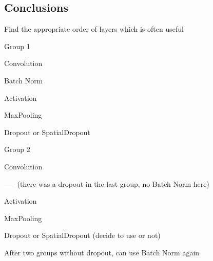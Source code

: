 	\subsection{Conclusions}
Find the appropriate order of layers which is often useful
	\begin{bulletedlist}
	\item Group 1
		\begin{bulletedlist}
			\item Convolution
			\item Batch Norm
			\item Activation
			\item MaxPooling
			\item Dropout or SpatialDropout
		\end{bulletedlist}
	\item Group 2
		\begin{bulletedlist}
			\item Convolution
			\item ----- (there was a dropout in the last group, no Batch Norm here)
			\item Activation
			\item MaxPooling
			\item Dropout or SpatialDropout (decide to use or not)
			\item After two groups without dropout, can use Batch Norm again
		\end{bulletedlist}
	\end{bulletedlist} 